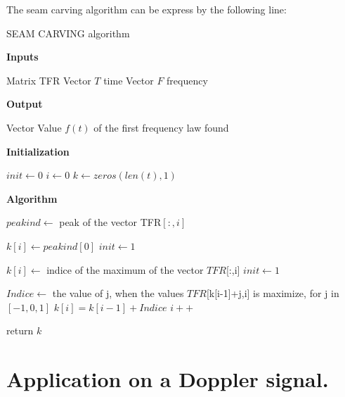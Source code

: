 The seam carving algorithm can be express by the following line:

\begin{algorithm}[H]
  \caption{SEAM CARVING algorithm }
  
  \textbf{Inputs}%
  \begin{algorithmic}[1]
    \STATE Matrix TFR
    \STATE Vector $T$ time
    \STATE Vector $F$ frequency
  \end{algorithmic}
  \bigskip

  \textbf{Output}%
  \begin{algorithmic}[1]
    \STATE Vector Value $f(t)$ of the first frequency law found
  \end{algorithmic}
  \bigskip
  
  \textbf{Initialization}%
  \begin{algorithmic}[1]
   	\STATE $init\gets 0$
   	\STATE $i\gets 0$
	\STATE $k\gets zeros(len(t),1)$
  \end{algorithmic}
  
  
  \textbf{Algorithm}%
  \begin{algorithmic}[1]

     	  	\STATE $peakind\gets$ peak of the vector TFR$[:,i]$
     	
	 	
				\STATE $k[i]\gets peakind[0]$
				\STATE $init\gets 1$
				
	 	
			\ELSE{}
					\STATE $k[i]\gets$ indice of the maximum of the vector $TFR$[:,i]
					\STATE $init\gets 1$
				\ENDIF
			\ENDIF
				
		\ELSE
			\STATE $Indice\gets$ the value of j, when the values $TFR$[k[i-1]+j,i] is maximize, for j in $[-1,0,1]$
			\STATE $k[i] = k[i-1] + Indice$
	 	\ENDIF
	 	\STATE $i++$
	\ENDWHILE 
	
	
  return $k$


  \end{algorithmic}
\end{algorithm}

\section{Application on a Doppler signal.}

